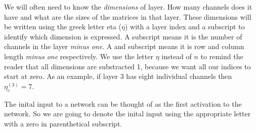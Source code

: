 We will often need to know the {\em dimensions} of layer.
How many channels does it have and what are the sizes of the matrices in that layer.
These dimensions will be written using the greek letter eta ($\eta$) with a layer index and a subscript to identify which dimension is expressed.
A  subscript means it is the number of channels in the layer {\em minus one}.
A  and  subscript means it is row and column length {\em minus one} respectively.
We use the letter $\eta$ instead of $n$ to remind the reader that all dimensions are substracted 1, because we want all our indices to start at zero.
As an example, if layer $3$ has eight individual channels then $\eta^{(3)}_c = 7$.

The inital input to a network can be thought of as the first activation to the network.
So we are going to denote the inital input using the appropriate  letter with a zero in parenthetical subscript.
\stopsubsubject


\startsubsection[title=Fully-connected layer]

\stopsubsection

\startsubsection[title=Convolutional layer]

\startsubsubsection[title=Where is the convolution?]
\stopsubsubsection
\stopsubsection

\startsubsection[title=Downsampling layer]

\stopsubsection

\startsubsection[title=The activation function]

\stopsubsection

\startsubsection[title=Output layer]

\stopsubsection